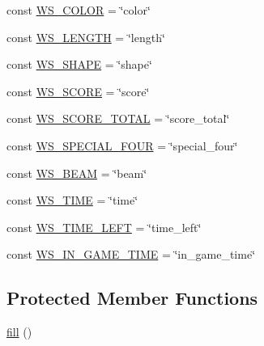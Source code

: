 \begin{DoxyCompactItemize}
\item 
const \hyperlink{class_m3_match_a855346f477d9636cb2a2996c9e5e28f6}{W\+S\+\_\+\+C\+O\+L\+OR} = \char`\"{}color\char`\"{}
\item 
const \hyperlink{class_m3_match_a6916ad49990f228d3a371e25eee61b1a}{W\+S\+\_\+\+L\+E\+N\+G\+TH} = \char`\"{}length\char`\"{}
\item 
const \hyperlink{class_m3_match_a49c04df228ef973eb2211f1de3ca2d43}{W\+S\+\_\+\+S\+H\+A\+PE} = \char`\"{}shape\char`\"{}
\item 
const \hyperlink{class_m3_match_a8ee94c3e0228dff0b522ed340a6df7c2}{W\+S\+\_\+\+S\+C\+O\+RE} = \char`\"{}score\char`\"{}
\item 
const \hyperlink{class_m3_match_a28625e21bb188cf6d7016e9c56756e63}{W\+S\+\_\+\+S\+C\+O\+R\+E\+\_\+\+T\+O\+T\+AL} = \char`\"{}score\+\_\+total\char`\"{}
\item 
const \hyperlink{class_m3_match_a7480b6609d60299dd2e93f35241f4b60}{W\+S\+\_\+\+S\+P\+E\+C\+I\+A\+L\+\_\+\+F\+O\+UR} = \char`\"{}special\+\_\+four\char`\"{}
\item 
const \hyperlink{class_m3_match_a0582e88461ca6943c952c30e00fb8b7a}{W\+S\+\_\+\+B\+E\+AM} = \char`\"{}beam\char`\"{}
\item 
const \hyperlink{class_m3_match_aacd1af33e91f6cb37137ccfc946020d5}{W\+S\+\_\+\+T\+I\+ME} = \char`\"{}time\char`\"{}
\item 
const \hyperlink{class_m3_match_a27e119f20e0791cc080502f295e07e9c}{W\+S\+\_\+\+T\+I\+M\+E\+\_\+\+L\+E\+FT} = \char`\"{}time\+\_\+left\char`\"{}
\item 
const \hyperlink{class_m3_match_a8ad77d1d98570a99b3f082f38df59f9a}{W\+S\+\_\+\+I\+N\+\_\+\+G\+A\+M\+E\+\_\+\+T\+I\+ME} = \char`\"{}in\+\_\+game\+\_\+time\char`\"{}
\end{DoxyCompactItemize}
\subsection*{Protected Member Functions}
\begin{DoxyCompactItemize}
\item 
\hyperlink{class_m3_match_a17757688db1d5ce6577b73c669dc9d11}{fill} ()
\end{DoxyCompactItemize}
